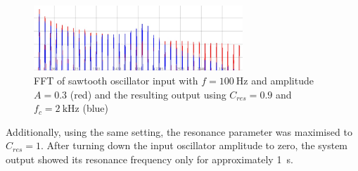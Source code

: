\documentclass[a4paper, 12pt]{article}
\begin{document}
\begin{figure}[h!]
	\centering
	\includegraphics[width=0.7\textwidth]{fft-sawtooth-resonance.jpg}
	\caption{FFT of sawtooth oscillator input with $f=\SI{100}{\hertz}$ and amplitude $A=0.3$ (red) and the resulting output using $C_{res}=0.9$ and $f_c = \SI{2}{\kilo\hertz}$ (blue)}
	\label{fig:fft-sawtooth-resonance}
\end{figure}

Additionally, using the same setting, the resonance parameter was maximised to $C_{res}=1$. After turning down the input oscillator amplitude to zero, the system output showed its resonance frequency only for approximately \SI{1}{\second}.

\sloppy
\printbibliography
\end{document}

